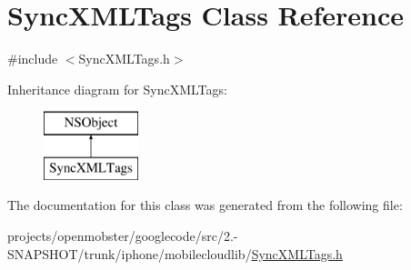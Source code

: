 \hypertarget{interface_sync_x_m_l_tags}{
\section{\-Sync\-X\-M\-L\-Tags \-Class \-Reference}
\label{interface_sync_x_m_l_tags}
}


{\ttfamily \#include $<$\-Sync\-X\-M\-L\-Tags.\-h$>$}

\-Inheritance diagram for \-Sync\-X\-M\-L\-Tags\-:\begin{figure}[H]
\begin{center}
\leavevmode
\includegraphics[height=2.000000cm]{interface_sync_x_m_l_tags}
\end{center}
\end{figure}


\-The documentation for this class was generated from the following file\-:\begin{DoxyCompactItemize}
\item 
projects/openmobster/googlecode/src/2.-\/\-S\-N\-A\-P\-S\-H\-O\-T/trunk/iphone/mobilecloudlib/\hyperlink{_sync_x_m_l_tags_8h}{\-Sync\-X\-M\-L\-Tags.\-h}\end{DoxyCompactItemize}
